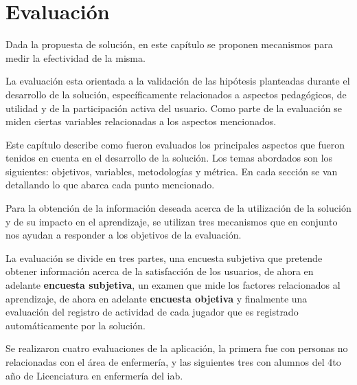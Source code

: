 \chapter{Evaluación}

Dada la propuesta de solución, en este capítulo se proponen mecanismos para medir la
efectividad de la misma.

La evaluación esta orientada a la validación de las hipótesis planteadas durante
el desarrollo de la solución, específicamente relacionados a aspectos
pedagógicos, de utilidad y de la participación activa del usuario. Como parte de la 
evaluación se miden ciertas variables relacionadas a los aspectos mencionados.

Este capítulo describe como fueron evaluados los principales aspectos que fueron
tenidos en cuenta en el desarrollo de la solución. Los temas abordados son los siguientes:
objetivos, variables, metodologías y métrica. En cada sección se van detallando
lo que abarca cada punto mencionado.


Para la obtención de la información deseada acerca de la utilización de la
solución y de su impacto en el aprendizaje, se utilizan tres mecanismos que en
conjunto nos ayudan a responder a los objetivos de la evaluación.

La evaluación se divide en tres partes, una encuesta subjetiva que pretende
obtener información acerca de la satisfacción de los usuarios, de ahora en
adelante \textbf{encuesta subjetiva}, un examen que mide los factores
relacionados al aprendizaje, de ahora en adelante \textbf{encuesta objetiva}  y
finalmente una evaluación del registro de actividad de cada jugador que es
registrado automáticamente por la solución.


Se realizaron cuatro evaluaciones de la aplicación, la primera fue con personas
no relacionadas con el área de enfermería, y las siguientes tres con alumnos del
4to año de Licenciatura en enfermería del \Gls{iab}.







